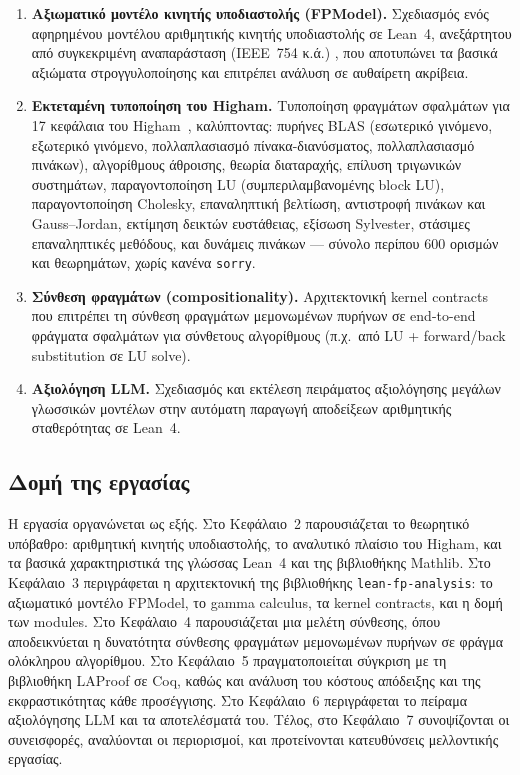 \documentclass[a4paper,12pt]{article}
\begin{document}
\begin{enumerate}
    \item \textbf{Αξιωματικό μοντέλο κινητής υποδιαστολής (FPModel).}
    Σχεδιασμός ενός αφηρημένου μοντέλου αριθμητικής κινητής υποδιαστολής σε
    Lean~4, ανεξάρτητου από συγκεκριμένη αναπαράσταση (IEEE~754 κ.ά.)
    \cite{ieee754_2019}, που αποτυπώνει τα βασικά αξιώματα στρογγυλοποίησης
    και επιτρέπει ανάλυση σε αυθαίρετη ακρίβεια.

    \item \textbf{Εκτεταμένη τυποποίηση του Higham.}
    Τυποποίηση φραγμάτων σφαλμάτων για 17 κεφάλαια του
    Higham~\cite{higham2002}, καλύπτοντας: πυρήνες BLAS (εσωτερικό γινόμενο,
    εξωτερικό γινόμενο, πολλαπλασιασμό πίνακα-διανύσματος, πολλαπλασιασμό
    πινάκων), αλγορίθμους άθροισης, θεωρία διαταραχής, επίλυση τριγωνικών
    συστημάτων, παραγοντοποίηση LU (συμπεριλαμβανομένης block LU),
    παραγοντοποίηση Cholesky, επαναληπτική βελτίωση, αντιστροφή πινάκων και
    Gauss--Jordan, εκτίμηση δεικτών ευστάθειας, εξίσωση Sylvester, στάσιμες
    επαναληπτικές μεθόδους, και δυνάμεις πινάκων --- σύνολο περίπου 600
    ορισμών και θεωρημάτων, χωρίς κανένα \texttt{sorry}.

    \item \textbf{Σύνθεση φραγμάτων (compositionality).}
    Αρχιτεκτονική kernel contracts που επιτρέπει τη σύνθεση φραγμάτων
    μεμονωμένων πυρήνων σε end-to-end φράγματα σφαλμάτων για σύνθετους
    αλγορίθμους (π.χ.\ από LU + forward/back substitution σε LU solve).

    \item \textbf{Αξιολόγηση LLM.}
    Σχεδιασμός και εκτέλεση πειράματος αξιολόγησης μεγάλων γλωσσικών μοντέλων
    στην αυτόματη παραγωγή αποδείξεων αριθμητικής σταθερότητας σε Lean~4. 
\end{enumerate}

\subsection{Δομή της εργασίας}

Η εργασία οργανώνεται ως εξής. Στο Κεφάλαιο~2 παρουσιάζεται το θεωρητικό
υπόβαθρο: αριθμητική κινητής υποδιαστολής, το αναλυτικό πλαίσιο του Higham,
και τα βασικά χαρακτηριστικά της γλώσσας Lean~4 και της βιβλιοθήκης Mathlib.
Στο Κεφάλαιο~3 περιγράφεται η αρχιτεκτονική της βιβλιοθήκης
\texttt{lean-fp-analysis}: το αξιωματικό μοντέλο FPModel, το gamma calculus,
τα kernel contracts, και η δομή των modules. Στο Κεφάλαιο~4 παρουσιάζεται
μια μελέτη σύνθεσης, όπου αποδεικνύεται η δυνατότητα σύνθεσης φραγμάτων
μεμονωμένων πυρήνων σε φράγμα ολόκληρου αλγορίθμου. Στο Κεφάλαιο~5
πραγματοποιείται σύγκριση με τη βιβλιοθήκη LAProof σε Coq, καθώς και ανάλυση
του κόστους απόδειξης και της εκφραστικότητας κάθε προσέγγισης. Στο
Κεφάλαιο~6 περιγράφεται το πείραμα αξιολόγησης LLM και τα αποτελέσματά του.
Τέλος, στο Κεφάλαιο~7 συνοψίζονται οι συνεισφορές, αναλύονται οι περιορισμοί,
και προτείνονται κατευθύνσεις μελλοντικής εργασίας.
\end{document}
